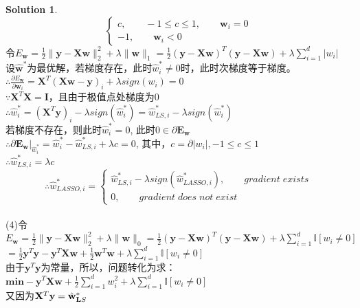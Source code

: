 \documentclass[a4paper,UTF8]{article}
\numberwithin{equation}{section}
\theoremstyle{definition}
\newtheorem*{solution}{Solution}
\begin{document}
\begin{solution}
$$\begin{cases}
c, \qquad -1\leq c \leq 1, \qquad \mathbf w_i = 0 \\
-1, \qquad \mathbf w_i < 0
\end{cases}$$
令$E_{\mathbf w} = \frac{1}{2}\lVert \mathbf y - \mathbf X \mathbf w \rVert_2^2 + \lambda \lVert \mathbf w\rVert_1= \frac{1}{2}(\mathbf y - \mathbf X \mathbf w)^T(\mathbf y - \mathbf X \mathbf w) + \lambda \sum_{i=1}^d \vert w_i \vert$\\
设$\hat{\mathbf w}^*$为最优解，若梯度存在，此时$\hat{w}_i^* \neq 0$时，此时次梯度等于梯度。\\
$\therefore \frac{\partial E_{\mathbf w}}{\partial \mathbf w_i} = \mathbf{X}^T (\mathbf X \mathbf w - \mathbf y)_i + \lambda sign(w_i) = 0$\\
$\because \mathbf{X}^T\mathbf X = \mathbf I$，且由于极值点处梯度为0\\
$\therefore \hat{w}_i^* = (\mathbf{X}^T \mathbf y)_i - \lambda sign(\hat{w}_i^*) = \hat{w}_{LS,i}^* - \lambda sign(\hat{w}_i^*)$\\
若梯度不存在，则此时$\hat{w}_i^* = 0$, 此时$0 \in \partial \mathbf E_{\mathbf w}$\\
$\therefore \partial \mathbf E_{\mathbf w} \vert_{\hat{w}_i^*} = \hat{w}_i^* - \hat{w}^*_{LS,i} + \lambda c = 0$, 其中，$c=\partial \vert w_i\vert, -1\leq c\leq 1$\\
$\therefore \hat{w}_{LS,i}^* = \lambda c$\\
$$\therefore \hat{w}_{LASSO,i}^* = 
\begin{cases}
\hat{w}^*_{LS,i}-\lambda sign(\hat{w}^*_{LASSO,i}), \qquad gradient\; exists\\
0, \qquad gradient\; does\; not\; exist
\end{cases}$$\\
(4)令$E_{\mathbf w} = \frac{1}{2}\lVert \mathbf y - \mathbf X \mathbf w \rVert_2^2 + \lambda \lVert \mathbf w\rVert_0= \frac{1}{2}(\mathbf y - \mathbf X \mathbf w)^T(\mathbf y - \mathbf X \mathbf w) + \lambda \sum_{i=1}^d \mathbb{I}[w_i \neq 0]$\\
$=\frac{1}{2}\mathbf{y}^T\mathbf y - \mathbf{y}^T\mathbf X \mathbf w + \frac{1}{2}\mathbf{w}^T\mathbf w + \lambda \sum_{i=1}^d \mathbb{I}[w_i \neq 0]$\\
由于$\mathbf{y}^T\mathbf y$为常量，所以，问题转化为求：\\
$\textbf{min} -\mathbf{y}^T\mathbf X \mathbf w + \frac{1}{2}\sum_{i=1}^{d} w_i^2 + \lambda \sum_{i=1}^d \mathbb{I}[w_i \neq 0]$\\
又因为$\mathbf{X}^T \mathbf y = \hat{\mathbf w}^*_{\textbf LS}$\\

\end{solution}
\end{document}
